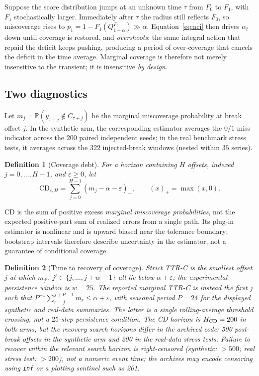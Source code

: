 \documentclass[10pt]{article}
\newtheorem{definition}{Definition}
\newcommand{\Prob}{\mathbb{P}}
\begin{document}
Suppose the score distribution jumps at an unknown time $\tau$ from $F_0$ to
$F_1$, with $F_1$ stochastically larger. Immediately after $\tau$ the radius
still reflects $F_0$, so miscoverage rises to
$p_1 = 1 - F_1(Q^{F_0}_{1-\alpha}) \gg \alpha$. Equation~\eqref{eq:aci} then
drives $\alpha_t$ down until coverage is restored, and \emph{overshoots}: the
same integral action that repaid the deficit keeps pushing, producing a period
of over-coverage that cancels the deficit in the time average. Marginal
coverage is therefore not merely insensitive to the transient; it is
insensitive \emph{by design}.

\subsection{Two diagnostics}

Let $m_j=\Prob(y_{\tau+j}\notin C_{\tau+j})$ be the marginal
miscoverage probability at break offset $j$. In the synthetic arm, the
corresponding estimator averages the $0/1$ miss indicator across the $200$
paired independent seeds; in the real benchmark stress tests, it averages
across the $322$ injected-break windows (nested within $35$ series).

\begin{definition}[Coverage debt]
For a horizon containing $H$ offsets, indexed $j=0,\ldots,H-1$, and
$\varepsilon\geq0$, let
\begin{equation}
\mathrm{CD}_{\varepsilon,H}
=\sum_{j=0}^{H-1}(m_j-\alpha-\varepsilon)_+,
\qquad (x)_+=\max(x,0).
\label{eq:cd}
\end{equation}
\end{definition}

CD is the sum of positive excess \emph{marginal miscoverage probabilities},
not the expected positive-part sum of realized errors from a single path.
Its plug-in estimator is nonlinear and is upward biased near the tolerance
boundary; bootstrap intervals therefore describe uncertainty in the estimator,
not a guarantee of conditional coverage.

\begin{definition}[Time to recovery of coverage]
Strict TTR-C is the smallest offset $j$ at which
$m_{j'},\,j'\in\{j,\ldots,j+w-1\}$ all lie below $\alpha+\varepsilon$;
the experimental persistence window is $w=25$.
The reported \emph{marginal} TTR-C is instead the first $j$ such that
$P^{-1}\sum_{r=j}^{j+P-1}m_r\leq\alpha+\varepsilon$, with seasonal
period $P=24$ for the displayed synthetic and real-data summaries.
The latter is a single rolling-average threshold crossing, not a
$25$-step persistence condition. The CD horizon is $H_{\rm CD}=200$ in
both arms, but the \emph{recovery} search horizons differ in the archived
code: 500 post-break offsets in the synthetic arm and 200 in the real-data
stress tests. Failure to recover within the relevant search horizon is
right-censored (synthetic: $>500$; real stress test: $>200$), not a
numeric event time; the archives may encode censoring using \texttt{inf}
or a plotting sentinel such as 201.
\end{definition}
\end{document}
